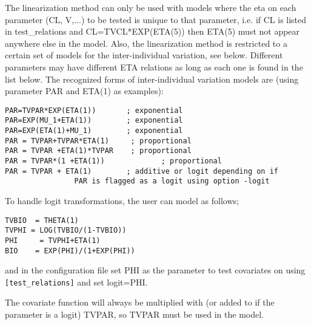 The linearization method can only be used with models where the eta on each parameter (CL, V,...) to be tested is unique to that parameter, i.e. if  CL is listed in test\_relations and CL=TVCL*EXP(ETA(5)) then ETA(5) must not appear anywhere else in the model. Also, the linearization method is restricted to a certain set of models for the inter-individual variation, see below. Different parameters may have different ETA relations as long as each one is found in the list below.
The recognized forms of inter-individual variation models are (using parameter PAR and ETA(1) as  examples):
\begin{verbatim}
PAR=TVPAR*EXP(ETA(1))	   	; exponential
PAR=EXP(MU_1+ETA(1))     	; exponential
PAR=EXP(ETA(1)+MU_1)    	; exponential
PAR = TVPAR+TVPAR*ETA(1)     ; proportional
PAR = TVPAR +ETA(1)*TVPAR    ; proportional
PAR = TVPAR*(1 +ETA(1))          	; proportional
PAR = TVPAR + ETA(1)   	 	; additive or logit depending on if 
                PAR is flagged as a logit using option -logit
\end{verbatim}
To handle logit transformations, the user can model as follows;
\begin{verbatim}
TVBIO  = THETA(1)
TVPHI = LOG(TVBIO/(1-TVBIO))
PHI     = TVPHI+ETA(1)	
BIO    = EXP(PHI)/(1+EXP(PHI))
\end{verbatim}
and in the configuration file set PHI as the parameter to test covariates on using \verb|[test_relations]| and set logit=PHI.

The covariate function will always be multiplied with (or added to if the parameter is a logit) TVPAR, so TVPAR must be used in the model.

